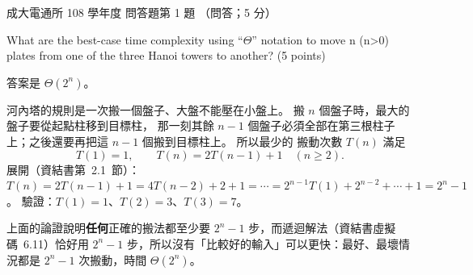 \begin{pastexam}[label={px:ncku-108-comm-ds-04}]{成大電通所 108 學年度 問答題第 1 題}
（問答；5 分）

What are the best-case time complexity using ``$\Theta$'' notation to move n (n>0) plates from one of
the three Hanoi towers to another? (5 points)
\end{pastexam}

\begin{pastsoln}
答案是 $\Theta(2^n)$。

河內塔的規則是一次搬一個盤子、大盤不能壓在小盤上。 搬 $n$ 個盤子時，最大的盤子要從起點柱移到目標柱，
那一刻其餘 $n - 1$ 個盤子必須全部在第三根柱子上；之後還要再把這 $n - 1$ 個搬到目標柱上。 所以最少的
搬動次數 $T(n)$ 滿足
\[
T(1) = 1, \qquad T(n) = 2T(n - 1) + 1 \quad (n \ge 2).
\]
展開（資結書第~2.1~節）：$T(n) = 2T(n-1) + 1 = 4T(n-2) + 2 + 1 = \cdots = 2^{n-1}T(1) + 2^{n-2} + \cdots
+ 1 = 2^n - 1$。 驗證：$T(1) = 1$、$T(2) = 3$、$T(3) = 7$。

上面的論證說明\textbf{任何}正確的搬法都至少要 $2^n - 1$ 步，而遞迴解法（資結書虛擬碼~6.11）恰好用
$2^n - 1$ 步，所以沒有「比較好的輸入」可以更快：最好、最壞情況都是 $2^n - 1$ 次搬動，時間
$\Theta(2^n)$。
\end{pastsoln}
